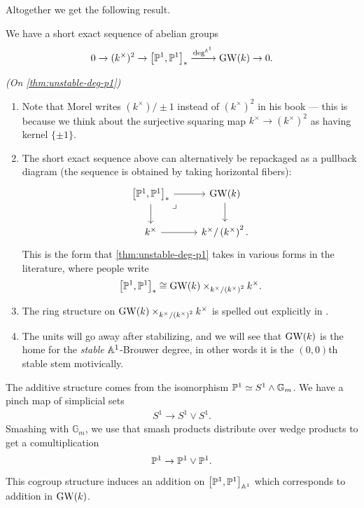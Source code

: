 \documentclass[11pt,openany]{book}
\let\smashprod\wedge
\begin{document}
Altogether we get the following result.

\begin{theorem}\label{thm:unstable-deg-p1} 
\cite[7.36]{Morel} We have a short exact sequence of abelian groups
\begin{equation}\label{eqn:unstable-deg-p1}
\begin{aligned}
    0 \to (k^\times)^2 \to \left[ \P^1,\P^1 \right]_\ast \xto{\deg^{\A^1}} \GW(k) \to 0.
\end{aligned}
\end{equation}
\end{theorem}

\begin{remark} \textit{(On \autoref{thm:unstable-deg-p1})}
\begin{enumerate}
    \item Note that Morel writes $(k^\times)/\pm1$ instead of $(k^\times)^2$ in his book --- this is because we think about the surjective squaring map $k^\times \to (k^{\times})^2$ as having kernel $\{\pm1\}$.
    \item The short exact sequence above can alternatively be repackaged as a pullback diagram (the sequence is obtained by taking horizontal fibers):
    \[ \begin{tikzcd}
    {\left[ \P^1,\P^1 \right]_\ast}\rar\dar\pb & \GW(k)\dar\\
    k^\times\rar & k^\times / \left( k^\times \right)^2.
\end{tikzcd} \]
    This is the form that \autoref{thm:unstable-deg-p1} takes in various forms in the literature, where people write
    \begin{align*}
        \left[ \P^1,\P^1 \right]_\ast \cong \GW(k) \times_{k^\times / \left( k^\times \right)^2} k^\times.
    \end{align*}
    \item The ring structure on $\GW(k) \times_{k^\times / \left( k^\times \right)^2} k^\times$ is spelled out explicitly in \cite{Cazanave-thesis}.

    \item The units will go away after stabilizing, and we will see that $\GW(k)$ is the home for the \textit{stable} $\A^1$-Brouwer degree, in other words it is the $(0,0)$th stable stem motivically.
\end{enumerate}
\end{remark}

The additive structure comes from the isomorphism $\P^1 \simeq S^1 \smashprod \mathbb{G}_m$. We have a pinch map of simplicial sets
\begin{align*}
    S^1 \to S^1\vee S^1.
\end{align*}
Smashing with $\mathbb{G}_m$, we use that smash products distribute over wedge products to get a comultiplication
\begin{align*}
    \P^1 \to \P^1 \vee \P^1.
\end{align*}
This cogroup structure induces an addition on $\left[ \P^1,\P^1 \right]_{\A^1}$ which corresponds to addition in $\GW(k)$.
\end{document}
